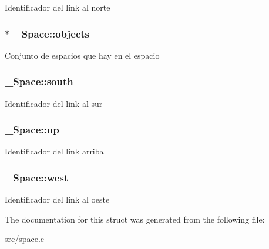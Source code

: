 Identificador del link al norte \hypertarget{struct__Space_a661ed8b0fc8085b6db70188aa5085625}{
\subsubsection[{objects}]{$\ast$ \+\_\+\+Space\+::objects}}\label{struct__Space_a661ed8b0fc8085b6db70188aa5085625}
Conjunto de espacios que hay en el espacio \hypertarget{struct__Space_a646b68c22a0bbf1685033c96109d31d1}{
\subsubsection[{south}]{ \+\_\+\+Space\+::south}}\label{struct__Space_a646b68c22a0bbf1685033c96109d31d1}
Identificador del link al sur \hypertarget{struct__Space_af2a50145d93dfb8d82b8b42138dc57a1}{
\subsubsection[{up}]{ \+\_\+\+Space\+::up}}\label{struct__Space_af2a50145d93dfb8d82b8b42138dc57a1}
Identificador del link arriba \hypertarget{struct__Space_a20c1d259e93b44e24ba82982e142eb9b}{
\subsubsection[{west}]{ \+\_\+\+Space\+::west}}\label{struct__Space_a20c1d259e93b44e24ba82982e142eb9b}
Identificador del link al oeste 

The documentation for this struct was generated from the following file\+:\begin{DoxyCompactItemize}
\item 
src/\hyperlink{space_8c}{space.\+c}\end{DoxyCompactItemize}
